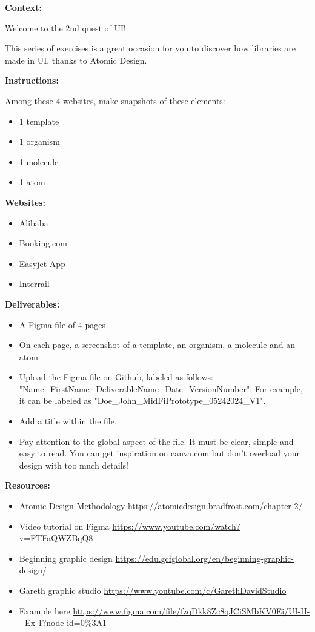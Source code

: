 \makeheaderfiles

\textbf{Context:}

Welcome to the 2nd quest of UI!

This series of exercises is a great occasion for you to discover how libraries are made in UI, thanks to Atomic Design.

\textbf{Instructions:}

Among these 4 websites, make snapshots of these elements:

\begin{itemize}
\item 1 template
\item 1 organism
\item 1 molecule
\item 1 atom
\end{itemize}

\textbf{Websites:}

\begin{itemize}
\item Alibaba
\item Booking.com
\item Easyjet App
\item Interrail
\end{itemize}

\textbf{Deliverables:}

\begin{itemize}
\item A Figma file of 4 pages
\item On each page, a screenshot of a template, an organism, a molecule and an atom
\item Upload the Figma file on Github, labeled as follows: "Name\_FirstName\_DeliverableName\_Date\_VersionNumber". For example, it can be labeled as "Doe\_John\_MidFiPrototype\_05242024\_V1".
\item Add a title within the file.
\item Pay attention to the global aspect of the file. It must be clear, simple and easy to read. You can get inspiration on canva.com but don't overload your design with too much details!
\end{itemize}

\textbf{Resources:}

\begin{itemize}
\item Atomic Design Methodology \url{https://atomicdesign.bradfrost.com/chapter-2/}
\item Video tutorial on Figma \url{https://www.youtube.com/watch?v=FTFaQWZBqQ8}
\item Beginning graphic design \url{https://edu.gcfglobal.org/en/beginning-graphic-design/}
\item Gareth graphic studio \url{https://www.youtube.com/c/GarethDavidStudio}
\item Example here \url{https://www.figma.com/file/fzqDkk8Zc8qJCiSMbKV0Ei/UI-II---Ex-1?node-id=0%3A1}
\end{itemize}

